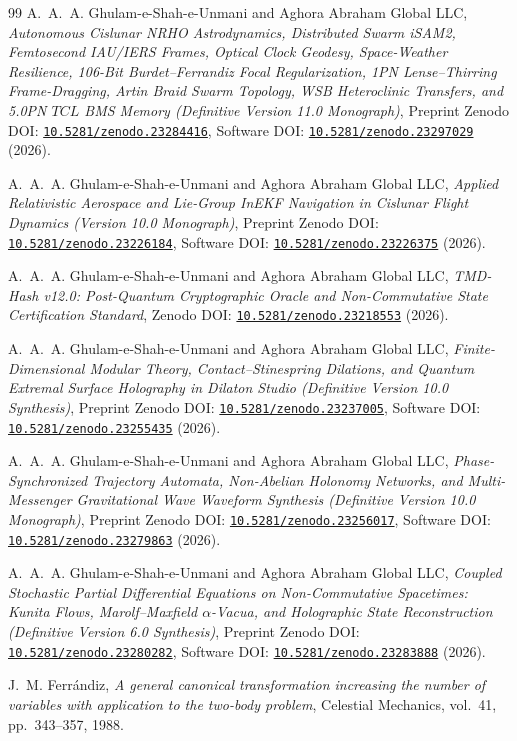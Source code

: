 \documentclass[11pt,a4paper,reqno]{article}
\def\mathrm#1{#1}%
\newcommand{\zenodo}[1]{\href{https://doi.org/10.5281/zenodo.#1}{\nolinkurl{10.5281/zenodo.#1}}}
\theoremstyle{plain}
\theoremstyle{definition}
\theoremstyle{remark}
\numberwithin{equation}{section}
\begin{document}
\begin{thebibliography}{99}
A.~A.~A. Ghulam-e-Shah-e-Unmani and {Aghora Abraham Global LLC},
\emph{Autonomous Cislunar NRHO Astrodynamics, Distributed Swarm iSAM2, Femtosecond IAU/IERS Frames, Optical Clock Geodesy, Space-Weather Resilience, 106-Bit Burdet--Ferrandiz Focal Regularization, 1PN Lense--Thirring Frame-Dragging, Artin Braid Swarm Topology, WSB Heteroclinic Transfers, and 5.0PN $\mathrm{TCL}$ BMS Memory (Definitive Version 11.0 Monograph)},
Preprint Zenodo DOI: \zenodo{23284416}, Software DOI: \zenodo{23297029} (2026).

A.~A.~A. Ghulam-e-Shah-e-Unmani and {Aghora Abraham Global LLC},
\emph{Applied Relativistic Aerospace and Lie-Group InEKF Navigation in Cislunar Flight Dynamics (Version 10.0 Monograph)},
Preprint Zenodo DOI: \zenodo{23226184}, Software DOI: \zenodo{23226375} (2026).

A.~A.~A. Ghulam-e-Shah-e-Unmani and {Aghora Abraham Global LLC},
\emph{TMD-Hash v12.0: Post-Quantum Cryptographic Oracle and Non-Commutative State Certification Standard},
Zenodo DOI: \zenodo{23218553} (2026).

A.~A.~A. Ghulam-e-Shah-e-Unmani and {Aghora Abraham Global LLC},
\emph{Finite-Dimensional Modular Theory, Contact--Stinespring Dilations, and Quantum Extremal Surface Holography in Dilaton Studio (Definitive Version 10.0 Synthesis)},
Preprint Zenodo DOI: \zenodo{23237005}, Software DOI: \zenodo{23255435} (2026).

A.~A.~A. Ghulam-e-Shah-e-Unmani and {Aghora Abraham Global LLC},
\emph{Phase-Synchronized Trajectory Automata, Non-Abelian Holonomy Networks, and Multi-Messenger Gravitational Wave Waveform Synthesis (Definitive Version 10.0 Monograph)},
Preprint Zenodo DOI: \zenodo{23256017}, Software DOI: \zenodo{23279863} (2026).

A.~A.~A. Ghulam-e-Shah-e-Unmani and {Aghora Abraham Global LLC},
\emph{Coupled Stochastic Partial Differential Equations on Non-Commutative Spacetimes: Kunita Flows, Marolf--Maxfield $\alpha$-Vacua, and Holographic State Reconstruction (Definitive Version 6.0 Synthesis)},
Preprint Zenodo DOI: \zenodo{23280282}, Software DOI: \zenodo{23283888} (2026).

J.~M. Ferr\'{a}ndiz,
\emph{A general canonical transformation increasing the number of variables with application to the two-body problem},
Celestial Mechanics, vol.~41, pp.~343--357, 1988.


\end{thebibliography}
\end{document}
